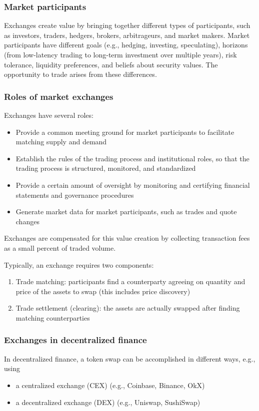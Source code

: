 \documentclass[11pt, reqno]{amsart}
\theoremstyle{definition}
\theoremstyle{remark}
\begin{document}
\subsubsection{Market participants}
Exchanges create value by bringing together different types of participants,
such as investors, traders, hedgers, brokers, arbitrageurs, and market makers.
Market participants have different goals (e.g., hedging, investing,
speculating), horizons (from low-latency trading to long-term investment over
multiple years), risk tolerance, liquidity preferences, and beliefs about
security values. The opportunity to trade arises from these differences.

\subsubsection{Roles of market exchanges}

Exchanges have several roles:
\begin{itemize}
    \item Provide a common meeting ground for market participants to
          facilitate matching supply and demand
	\item Establish the rules of the trading process and institutional roles, so
          that the trading process is structured, monitored, and standardized
	\item Provide a certain amount of oversight by monitoring and certifying
          financial statements and governance procedures
    \item Generate market data for market participants, such as trades and
          quote changes
\end{itemize}

Exchanges are compensated for this value creation by collecting transaction
fees as a small percent of traded volume.

Typically, an exchange requires two components:
\begin{enumerate}
	\item Trade matching: participants find a counterparty agreeing on quantity
	      and price of the assets to swap (this includes price discovery)
    \item Trade settlement (clearing): the assets are actually swapped after
          finding matching counterparties
\end{enumerate}

\subsubsection{Exchanges in decentralized finance}
In decentralized finance, a token swap can be accomplished in different ways,
e.g., using
\begin{itemize}
	\item a centralized exchange (CEX) (e.g., Coinbase, Binance, OkX)
	\item a decentralized exchange (DEX) (e.g., Uniswap, SushiSwap)
\end{itemize}
\end{document}
